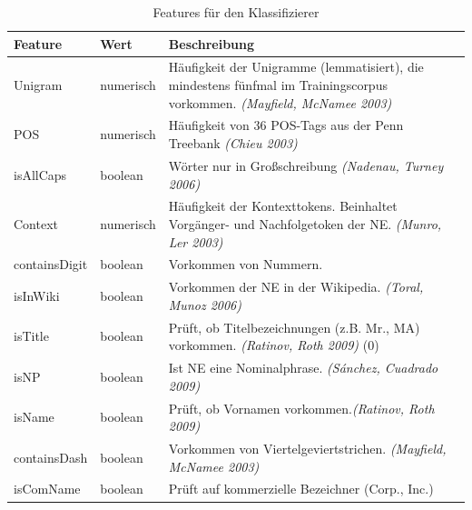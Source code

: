 \documentclass[a4paper, 11pt]{article}
\begin{document}
 \begin{table}
			 	\caption{Verteilung der Klassen nach Balancierung}
			 	\label{tab:VerteilungKlassen}
\end{table}
\begin{table}
 				\begin{tabularx}{\textwidth}{llX}
 					\toprule
 					Feature & Wert & Beschreibung\\
 					\midrule
 					Unigram & numerisch & Häufigkeit der Unigramme (lemmatisiert), die mindestens fünfmal im Trainingscorpus vorkommen. \textit{(Mayfield, McNamee 2003)} \\
 					POS & numerisch  & Häufigkeit von 36 POS-Tags aus der Penn Treebank \textit{(Chieu 2003)} \\
 					isAllCaps & boolean & Wörter nur in Großschreibung \textit{(Nadenau, Turney 2006)} \\
 					Context & numerisch & Häufigkeit der Kontexttokens. Beinhaltet Vorgänger- und Nachfolgetoken der NE. \textit{(Munro, Ler 2003)}  \\
 					containsDigit & boolean & Vorkommen von Nummern. \textit{}\\
 					isInWiki & boolean & Vorkommen der NE in der Wikipedia. \textit{(Toral, Munoz 2006)} \\
 							isTitle & boolean & Prüft, ob Titelbezeichnungen (z.B. Mr., MA) vorkommen. \textit{(Ratinov, Roth 2009)} (0)\\
 							isNP & boolean & Ist NE eine Nominalphrase. \textit{(Sánchez, Cuadrado 2009)} \\
 							isName & boolean & Prüft, ob Vornamen vorkommen.\textit{(Ratinov, Roth 2009)} \\
 							containsDash & boolean & Vorkommen von Viertelgeviertstrichen. \textit{(Mayfield, McNamee 2003)}  \\
isComName & boolean & Prüft auf kommerzielle Bezeichner (Corp., Inc.) \\
 					\bottomrule
 				\end{tabularx}
 				\caption{Features für den Klassifizierer}
 				\label{tab:allf1}
\end{table}
\end{document}
